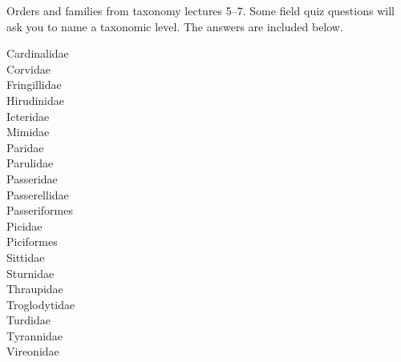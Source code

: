 \documentclass[12pt, addpoints]{exam}
\begin{document}
Orders and families from taxonomy lectures 5–7. Some field quiz questions will ask you to name a taxonomic level. The answers are included below.


\begin{multicols}{3}
	Cardinalidae \\
	Corvidae \\
	Fringillidae \\
	Hirudinidae \\
	Icteridae \\
	Mimidae \\
	Paridae \\
	Parulidae \\
	Passeridae \\
	Passerellidae \\
	Passeriformes \\
	Picidae \\
	Piciformes \\
	Sittidae \\
	Sturnidae \\
	Thraupidae \\
	Troglodytidae \\
	Turdidae \\
	Tyrannidae \\
	Vireonidae 
\end{multicols}
\end{document}
